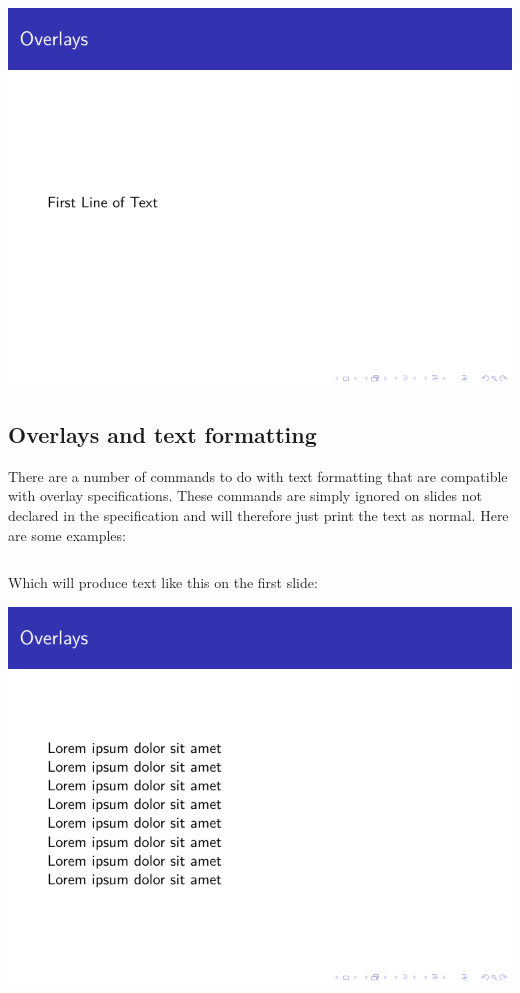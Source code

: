 \begin{column}{0.5\textwidth}
\includegraphics[page=3]{examples/beamer/overlay-only.pdf}

\subsection{Overlays and text formatting}

There are a number of commands to do with text formatting that are compatible with overlay specifications. These commands are simply ignored on slides not declared in the specification and will therefore just print the text as normal. Here are some examples:

\inputminted[linenos=true]{latex}{examples/beamer/overlay-text-format.tex}

Which will produce text like this on the first slide:

\includegraphics[page=1]{examples/beamer/overlay-text-format.pdf}


\end{column}
